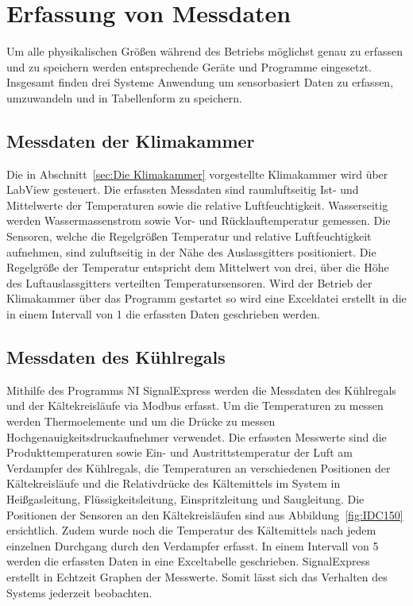 \section{Erfassung von Messdaten}
\label{sec:Erfassung von Messdaten}

Um alle physikalischen Größen während des Betriebs möglichst genau zu erfassen und zu speichern werden entsprechende Geräte und Programme eingesetzt. Insgesamt finden drei Systeme Anwendung um sensorbasiert Daten zu erfassen, umzuwandeln und in Tabellenform zu speichern.

\subsection{Messdaten der Klimakammer}
\label{subsec:Messdaten der Klimakammer}

Die in Abschnitt~\ref{sec:Die Klimakammer} vorgestellte Klimakammer wird über LabView gesteuert. Die erfassten Messdaten sind raumluftseitig Ist- und Mittelwerte der Temperaturen sowie die relative Luftfeuchtigkeit. Wasserseitig werden Wassermassenstrom sowie Vor- und Rücklauftemperatur gemessen. 
Die Sensoren, welche die Regelgrößen Temperatur und relative Luftfeuchtigkeit aufnehmen, sind zuluftseitig in der Nähe des Auslassgitters positioniert. Die Regelgröße der Temperatur entspricht dem Mittelwert von drei, über die Höhe des Luftauslassgitters verteilten Temperatursensoren. Wird der Betrieb der Klimakammer über das Programm gestartet so wird eine Exceldatei erstellt in die in einem Intervall von \unit{1}{\second} die erfassten Daten geschrieben werden.


\subsection{Messdaten des Kühlregals}
\label{subsec:Messdaten der Klimakammer}

Mithilfe des Programms NI SignalExpress werden die Messdaten des Kühlregals und der Kältekreisläufe via Modbus erfasst. Um die Temperaturen zu messen werden Thermoelemente  und um die Drücke zu messen Hochgenauigkeitsdruckaufnehmer verwendet. Die erfassten Messwerte sind die Produkttemperaturen sowie Ein- und Austrittstemperatur der Luft am Verdampfer des Kühlregals, die Temperaturen an verschiedenen Positionen der Kältekreisläufe und die Relativdrücke des Kältemittels im System in Heißgasleitung, Flüssigkeitsleitung, Einspritzleitung und Saugleitung. Die Positionen der Sensoren an den Kältekreisläufen sind aus Abbildung~\ref{fig:IDC150} ersichtlich. Zudem wurde noch die Temperatur des Kältemittels nach jedem einzelnen Durchgang durch den Verdampfer erfasst.
In einem Intervall von \unit{5}{\second} werden die erfassten Daten in eine Exceltabelle geschrieben. SignalExpress erstellt in Echtzeit Graphen der Messwerte. Somit lässt sich das Verhalten des Systems jederzeit beobachten.

